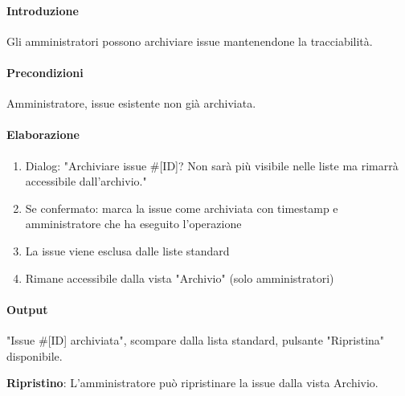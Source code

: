 \begin{reqbox}[title=REQ-FUN-25: Archivia Issue (solo Admin)]
\label{subsubsec:req-archivia-issue}

\paragraph{Introduzione}
Gli amministratori possono archiviare issue mantenendone la tracciabilità.

\paragraph{Precondizioni}
Amministratore, issue esistente non già archiviata.

\paragraph{Elaborazione}
\begin{enumerate}[leftmargin=1.1em]
\item Dialog: "Archiviare issue \#[ID]? Non sarà più visibile nelle liste ma rimarrà accessibile dall'archivio."
\item Se confermato: marca la issue come archiviata con timestamp e amministratore che ha eseguito l'operazione
\item La issue viene esclusa dalle liste standard
\item Rimane accessibile dalla vista "Archivio" (solo amministratori)
\end{enumerate}

\paragraph{Output}
"Issue \#[ID] archiviata", scompare dalla lista standard, pulsante "Ripristina" disponibile.

\textbf{Ripristino}: L'amministratore può ripristinare la issue dalla vista Archivio.

\end{reqbox}

\vspace{0.5cm}

\newpage



